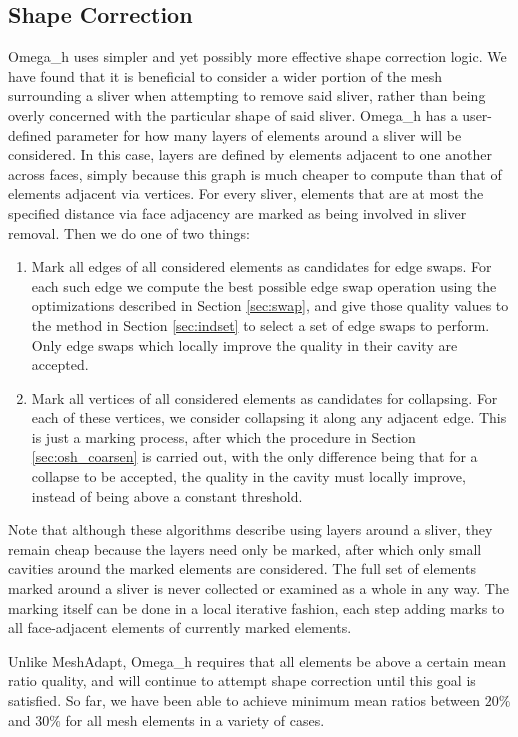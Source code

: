 \subsection{Shape Correction}
\label{sec:osh_shape}

Omega\_h uses simpler and yet possibly more effective shape correction logic.
We have found that it is beneficial to consider a wider portion of the
mesh surrounding a sliver when attempting to remove said sliver, rather
than being overly concerned with the particular shape of said sliver.
Omega\_h has a user-defined parameter for how many layers of elements
around a sliver will be considered.
In this case, layers are defined by elements adjacent to one another
across faces, simply because this graph is much cheaper to compute
than that of elements adjacent via vertices.
For every sliver, elements that are at most the specified distance
via face adjacency are marked as being involved in sliver removal.
Then we do one of two things:
\begin{enumerate}
\item Mark all edges of all considered elements as candidates for edge swaps.
For each such edge we compute the best possible edge swap operation
using the optimizations described in Section \ref{sec:swap},
and give those quality values to the method in Section \ref{sec:indset} to
select a set of edge swaps to perform.
Only edge swaps which locally improve the quality in their cavity are accepted.
\item Mark all vertices of all considered elements as candidates for collapsing.
For each of these vertices, we consider collapsing it along any adjacent edge.
This is just a marking process, after which the procedure in Section \ref{sec:osh_coarsen}
is carried out, with the only difference being that for a collapse to be accepted,
the quality in the cavity must locally improve, instead of being above a
constant threshold.
\end{enumerate}
Note that although these algorithms describe using layers around a sliver,
they remain cheap because the layers need only be marked, after which only
small cavities around the marked elements are considered.
The full set of elements marked around a sliver is never collected or examined
as a whole in any way.
The marking itself can be done in a local iterative fashion, each step adding
marks to all face-adjacent elements of currently marked elements.

Unlike MeshAdapt, Omega\_h requires that all elements be above a certain
mean ratio quality, and will continue to attempt shape correction until
this goal is satisfied.
So far, we have been able to achieve minimum mean ratios between $20\%$
and $30\%$ for all mesh elements in a variety of cases.

